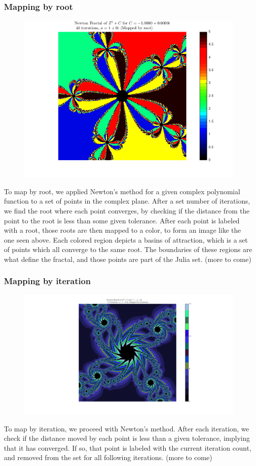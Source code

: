 \documentclass[12pt]{article}
\begin{document}
\begin{onehalfspace}
\subsubsection*{Mapping by root}
\begin{figure}[H]
\centering
\includegraphics[width=0.7\linewidth]{images/rootEx2}
\caption{}
\label{fig:rootEx2}
\end{figure}
To map by root, we applied Newton’s method for a given complex polynomial function to a set of points in the complex plane.  After a set number of iterations, we find the root where each point converges, by checking if the distance from the point to the root is less than some given tolerance.  After each point is labeled with a root, those roots are then mapped to a color, to form an image like the one seen above.   Each colored region depicts a basins of attraction, which is a set of points which all converge to the same root.  The boundaries of these regions are what define the fractal, and those points are part of the Julia set.  (more to come)
\subsubsection*{Mapping by iteration}
\begin{figure}[H]
	\centering
	\includegraphics[width=0.7\linewidth]{images/goodImage3}
	\caption{}
	\label{fig:rootEx2}
\end{figure}
To map by iteration, we proceed with Newton’s method.  After each iteration, we check if the distance moved by each point is less than a given tolerance, implying that it has converged.  If so, that point is labeled with the current iteration count, and removed from the set for all following iterations. (more to come)
\end{onehalfspace}
\pagebreak
\normalsize
\end{document}
